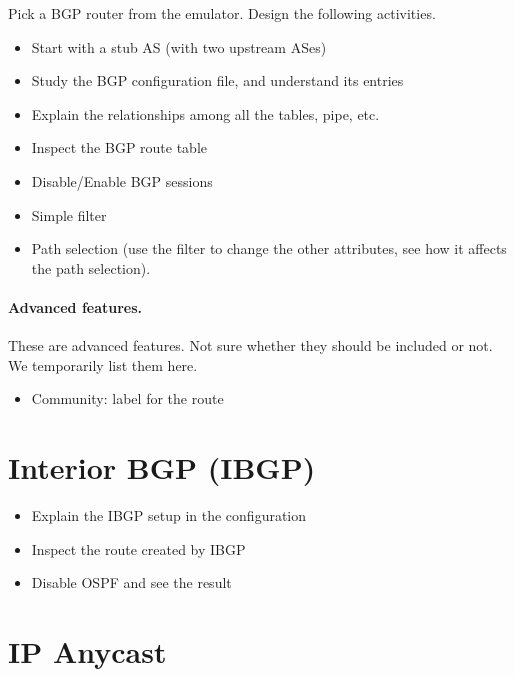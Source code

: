 Pick a BGP router from the emulator. 
Design the following activities.

\begin{itemize}
  \item Start with a stub AS (with two upstream ASes)
  \item Study the BGP configuration file, and understand its entries
  \item Explain the relationships among all the tables, pipe, etc.
  \item Inspect the BGP route table 
  \item Disable/Enable BGP sessions
  \item Simple filter  
  \item Path selection (use the filter to change the other attributes,
    see how it affects the path selection).
\end{itemize}

\paragraph{Advanced features.} 
These are advanced features. Not sure whether they should be included or not.
We temporarily list them here.

\begin{itemize}
  \item Community: label for the route
\end{itemize}




\section{Interior BGP (IBGP)} 


\begin{itemize}
  \item Explain the IBGP setup in the configuration 
  \item Inspect the route created by IBGP
  \item Disable OSPF and see the result
\end{itemize}
 


\section{IP Anycast} 

